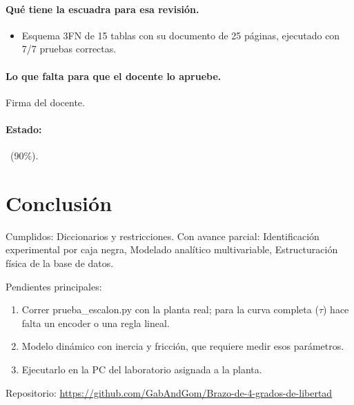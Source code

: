 \documentclass[a4paper,11pt]{article}
\begin{document}
\paragraph{Qué tiene la escuadra para esa revisión.}
\begin{itemize}
\item Esquema 3FN de 15 tablas con su documento de 25 páginas, ejecutado con 7/7 pruebas correctas.
\end{itemize}
\paragraph{Lo que falta para que el docente lo apruebe.} Firma del docente.
\paragraph{Estado:} \parcial~(90\%).
\section{Conclusión}
Cumplidos: Diccionarios y restricciones. Con avance parcial: Identificación experimental por caja negra, Modelado analítico multivariable, Estructuración física de la base de datos.
\par\smallskip Pendientes principales:
\begin{enumerate}
\item Correr prueba\_escalon.py con la planta real; para la curva completa ($\tau$) hace falta un encoder o una regla lineal.
\item Modelo dinámico con inercia y fricción, que requiere medir esos parámetros.
\item Ejecutarlo en la PC del laboratorio asignada a la planta.
\end{enumerate}
\par\smallskip\noindent Repositorio: \url{https://github.com/GabAndGom/Brazo-de-4-grados-de-libertad}
\end{document}
